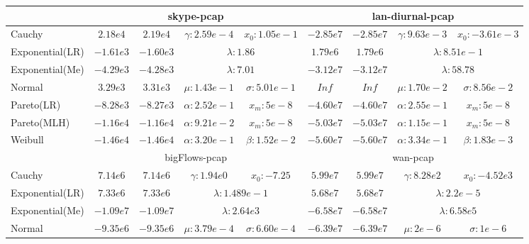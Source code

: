 \begin{table}[h!]
{\begin{tabular}{lcccccccc}
            & \multicolumn{4}{c}{skype-pcap}  & \multicolumn{4}{c}{lan-diurnal-pcap}   \\ \hline 
            Cauchy          & $2.18e4$    & $2.19e4$    & $\gamma:2.59e-4$ & $x_0:1.05e-1$    
            & $-2.85e7$   & $-2.85e7$   & $\gamma:9.63e-3$ & $x_0:-3.61e-3$    \\
            Exponential(LR) & $-1.61e3$   & $-1.60e3$   & \multicolumn{2}{c}{$\lambda:1.86$}   
            & $1.79e6$    & $1.79e6$    & \multicolumn{2}{c}{$\lambda:8.51e-1$}    \\
            Exponential(Me) & $-4.29e3$   & $-4.28e3$   & \multicolumn{2}{c}{$\lambda:7.01$}   
            & $-3.12e7$   & $-3.12e7$   & \multicolumn{2}{c}{$ \lambda:58.78$} \\
            Normal          & $3.29e3$    & $3.31e3$    & $\mu:1.43e-1 $    & $\sigma:5.01e-1$ 
            & $Inf$       & $Inf$       & $\mu:1.70e-2$     & $\sigma:8.56e-2$ \\
            Pareto(LR)      & $-8.28e3$   & $-8.27e3$   & $\alpha:2.52e-1$ & $x_m:5e-8$    
            & $-4.60e7$   & $-4.60e7$   & $\alpha:2.55e-1$ & $ x_m:5e-8$    \\
            Pareto(MLH)     & $-1.16e4$   & $-1.16e4$   & $\alpha:9.21e-2$ & $x_m:5e-8$    
            & $-5.03e7$   & $-5.03e7$   & $\alpha:1.15e-1$ & $ x_m:5e-8$    \\
            Weibull         & $-1.46e4$   & $ -1.46e4$  & $\alpha:3.20e-1$ & $\beta:1.52e-2$  
            & $-5.60e7$   & $-5.60e7$   & $\alpha:3.34e-1$ & $\beta:1.83e-3$  \\ \hline    
            & \multicolumn{4}{c}{bigFlows-pcap} & \multicolumn{4}{c}{wan-pcap}  \\ \hline
            Cauchy          & $7.14e6$    & $7.14e6$   & $\gamma:1.94e0$ &$x_0:-7.25$    
            & $5.99e7$    & $5.99e7$   & $ \gamma:8.28e2$ &$x_0:-4.52e3$    \\
            Exponential(LR) & $7.33e6$    & $7.33e6$   & \multicolumn{2}{c}{$\lambda:1.489e-1$}   
            & $5.68e7$    & $ 5.68e7$  & \multicolumn{2}{c}{$\lambda:2.2e-5$}   \\
            Exponential(Me) & $-1.09e7$   & $-1.09e7$  & \multicolumn{2}{c}{$\lambda:2.64e3$}   
            & $-6.58e7$   & $-6.58e7$  & \multicolumn{2}{c}{$\lambda:6.58e5$} \\
            Normal          & $-9.35e6$   & $-9.35e6$  & $\mu:3.79e-4$   &$\sigma:6.60e-4$ 
            & $-6.39e7$   & $-6.39e7$  & $\mu:2e-6$     & $\sigma:1e-6$ \\

\end{tabular}}
\end{table}
